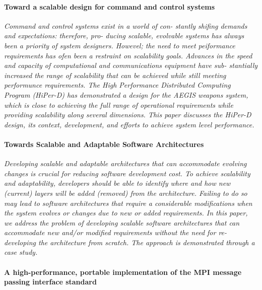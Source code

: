 \documentclass{article}
\begin{document}
\paragraph{Toward a scalable design for command and control systems}
\cite{caruso1997toward}

\emph{ Command and control systems exist in a world of con- stantly shifing
demands and expectations: therefore, pro- ducing scalable, evolvable systems
has always been a priority of system designers. Howevel; the need to meet
peiformance requirements has ofen been a restraint on scalability goals.
Advances in the speed and capacity of computational and communications
equipment have sub- stantially increased the range of scalability that can be
achieved while still meeting performunce requirements.  The High Performance
Distributed Computing Program (HiPer-D) has demonstrated a design for the AEGIS
weapons system, which is close to achieving the full range of operational
requirements while providing scalability along several dimensions. This paper
discusses the HiPer-D design, its context, development, and efforts to achieve
system level performance.}

\paragraph{Towards Scalable and Adaptable Software Architectures} \cite{fayad2005towards}

\emph{Developing scalable and adaptable architectures that can accommodate
evolving changes is crucial for reducing software development cost. To achieve
scalability and adaptability, developers should be able to identify where and
how new (current) layers will be added (removed) from the architecture.
Failing to do so may lead to software architectures that require a considerable
modifications when the system evolves or changes due to new or added
requirements. In this paper, we address the problem of developing scalable
software architectures that can accommodate new and/or modified requirements
without the need for re-developing the architecture from scratch. The approach
is demonstrated through a case study.}

\paragraph{A high-performance, portable implementation of the MPI message passing
interface standard} \cite{gropp1996high}
\end{document}
